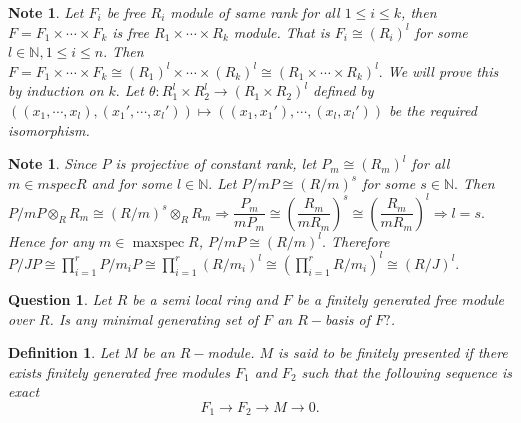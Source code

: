 \documentclass[11pt]{amsart}
\newtheorem{defn}[theorem]{Definition}
\newtheorem{qns}[theorem]{Question}
\newtheorem{note}[theorem]{Note}
\newcommand{\NN}{\mathbb N}
\DeclareMathOperator{\mspec}{\text{maxspec}}
\begin{document}
\begin{note}

Let $F_i$ be free $R_i$ module of same rank for all $1\leq i\leq k$, then $F=F_1\times\cdots\times F_k$ is free $R_1\times\cdots\times R_k$ module. That is $F_i\cong (R_i)^l$ for some $l\in{\NN},1\leq i\leq n.$ Then $F=F_1\times\cdots\times F_k\cong (R_1)^l\times\cdots\times (R_k)^l\cong (R_1\times\cdots\times R_k)^l.$ We will prove this by induction on $k.$ Let $\theta:R_1^l\times R_2^l\to (R_1\times R_2)^l$ defined by $((x_1,\cdots,x_l),(x_1',\cdots,x_l'))\mapsto ((x_1,x_1'),\cdots,(x_l,x_l'))$ be the required isomorphism.

\end{note}

\begin{note}

Since $P$ is projective of constant rank, let $P_m\cong (R_m)^l$ for all $m\in mspec R$ and for some $l\in{\NN}.$ Let $P/mP\cong (R/m)^s$ for some $s\in {\NN}.$ Then $P/mP\otimes_R R_m\cong (R/m)^s\otimes_R R_m \Rightarrow \dfrac{P_m}{mP_m}\cong \left(\dfrac{R_m}{mR_m}\right)^s\cong \left(\dfrac{R_m}{mR_m}\right)^l\Rightarrow l=s.$ Hence for any $m\in\mspec R$, $P/mP\cong (R/m)^l.$ Therefore $P/JP\cong \displaystyle\prod_{i=1}^r P/m_iP\cong \displaystyle\prod_{i=1}^r (R/m_i)^l\cong \left(\displaystyle\prod_{i=1}^r R/m_i\right)^l\cong (R/J)^l.$

\end{note}

\begin{qns}

Let $R$ be a semi local ring and $F$ be a finitely generated free module over $R$. Is any minimal generating set of $F$ an $R-$basis of $F?$.

\end{qns}


\begin{defn}

Let $M$ be an $R-$module. $M$ is said to be finitely presented if there exists finitely generated free modules $F_1$ and $F_2$ such that the following sequence is exact $$F_1\to F_2\to M\to 0.$$

\end{defn}
\end{document}
